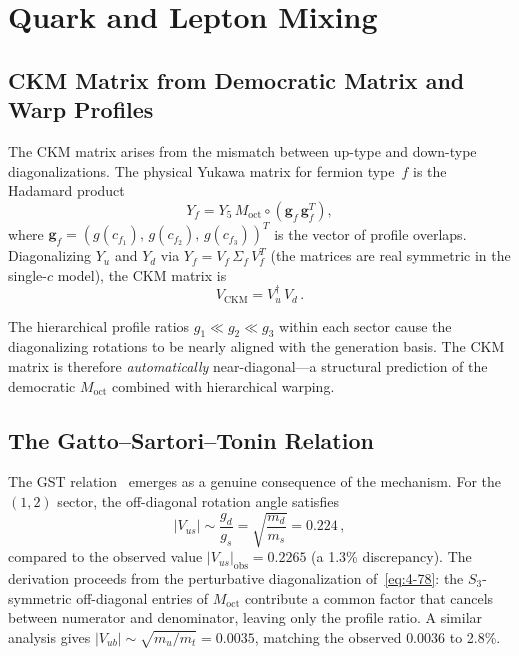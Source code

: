 \section{Quark and Lepton Mixing}
\label{sec:4-ckm}

\subsection{CKM Matrix from Democratic Matrix and Warp Profiles}
\label{sec:4-ckm-mechanism}

The CKM matrix arises from the mismatch between up-type and down-type diagonalizations. The physical Yukawa matrix for fermion type~$f$ is the Hadamard product
\begin{equation}
  Y_f = Y_5\, M_{\mathrm{oct}} \circ (\mathbf{g}_f\, \mathbf{g}_f^T),
  \label{eq:4-78}
\end{equation}
where $\mathbf{g}_f = (g(c_{f_1}),\, g(c_{f_2}),\, g(c_{f_3}))^T$ is the vector of profile overlaps. Diagonalizing $Y_u$ and $Y_d$ via $Y_f = V_f\, \Sigma_f\, V_f^T$ (the matrices are real symmetric in the single-$c$ model), the CKM matrix is
\begin{equation}
  V_{\mathrm{CKM}} = V_u^\dagger\, V_d\,.
  \label{eq:4-79}
\end{equation}

The hierarchical profile ratios $g_1 \ll g_2 \ll g_3$ within each sector cause the diagonalizing rotations to be nearly aligned with the generation basis. The CKM matrix is therefore \emph{automatically} near-diagonal---a structural prediction of the democratic $M_{\mathrm{oct}}$ combined with hierarchical warping.

\subsection{The Gatto--Sartori--Tonin Relation}
\label{sec:4-gst}

The GST relation~\cite{ch4:GST1968} emerges as a genuine consequence of the mechanism. For the $(1,2)$ sector, the off-diagonal rotation angle satisfies
\begin{equation}
  |V_{us}| \sim \frac{g_d}{g_s} = \sqrt{\frac{m_d}{m_s}} = 0.224\,,
  \label{eq:4-80}
\end{equation}
compared to the observed value $|V_{us}|_{\mathrm{obs}} = 0.2265$ (a 1.3\% discrepancy). The derivation proceeds from the perturbative diagonalization of~\eqref{eq:4-78}: the $S_3$-symmetric off-diagonal entries of $M_{\mathrm{oct}}$ contribute a common factor that cancels between numerator and denominator, leaving only the profile ratio. A similar analysis gives $|V_{ub}| \sim \sqrt{m_u/m_t} = 0.0035$, matching the observed $0.0036$ to 2.8\%.

